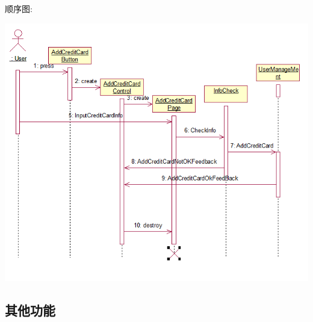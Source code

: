 \documentclass[11pt]{article}
\begin{document}
			顺序图: 
			\begin{center}
			\includegraphics[scale=0.42]{普通用户添加信用卡顺序图.png}
			\end{center}
	
	\subsection{其他功能}
\end{document}
